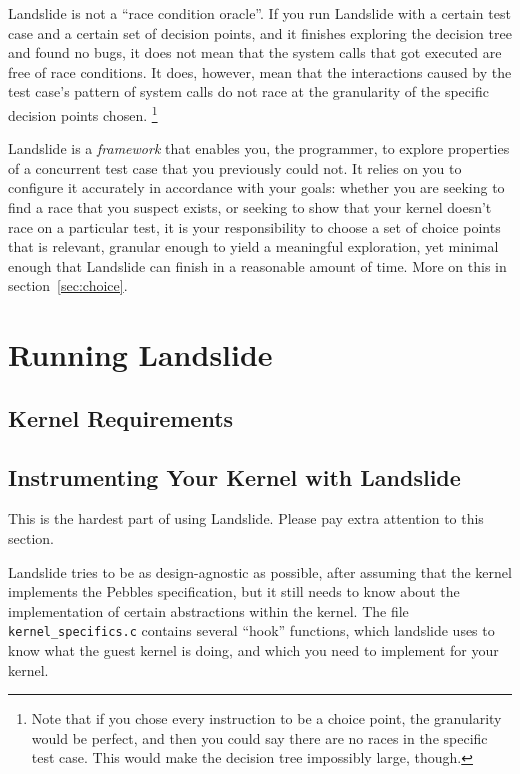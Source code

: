 \documentclass{article}
\begin{document}
Landslide is not a ``race condition oracle''. If you run Landslide with a certain test case and a certain set of decision points, and it finishes exploring the decision tree and found no bugs, it does not mean that the system calls that got executed are free of race conditions.
It does, however, mean that the interactions caused by the test case's pattern of system calls do not race at the granularity of the specific decision points chosen.
\footnote{Note that if you chose every instruction to be a choice point, the granularity would be perfect, and then you could say there are no races in the specific test case. This would make the decision tree impossibly large, though.}

Landslide is a {\em framework} that enables you, the programmer, to explore properties of a concurrent test case that you previously could not. It relies on you to configure it accurately in accordance with your goals: whether you are seeking to find a race that you suspect exists, or seeking to show that your kernel doesn't race on a particular test, it is your responsibility to choose a set of choice points that is relevant, granular enough to yield a meaningful exploration, yet minimal enough that Landslide can finish in a reasonable amount of time. More on this in section~\ref{sec:choice}.

\section{Running Landslide}

\subsection{Kernel Requirements}

\subsection{Instrumenting Your Kernel with Landslide}

This is the hardest part of using Landslide. Please pay extra attention to this section.

Landslide tries to be as design-agnostic as possible, after assuming that the kernel implements the Pebbles specification, but it still needs to know about the implementation of certain abstractions within the kernel. The file \texttt{kernel\_specifics.c} contains several ``hook'' functions, which landslide uses to know what the guest kernel is doing, and which you need to implement for your kernel.
\end{document}
